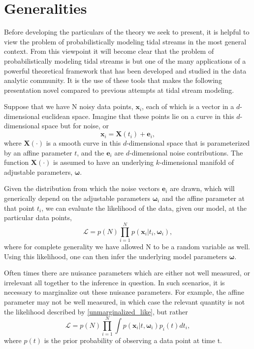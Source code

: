 \documentclass[12pt,preprint]{aastex}
\newcommand{\mtensor}[1]{\boldsymbol{#1}}
\newcommand{\mvector}[1]{\mtensor{#1}}
\newcommand{\ve}{\mvector{e}}
\newcommand{\vx}{\mvector{x}}
\newcommand{\vX}{\mvector{X}}
\newcommand{\vomega}{\mvector{\omega}}
\newcommand{\like}{\mathscr{L}}
\begin{document}
\section{Generalities}\label{Sec:Generalities}



Before developing the particulars of the theory we seek to present, it is helpful to view the problem of probabilistically modeling tidal streams in the most general context. From this viewpoint it will become clear that the problem of probabilistically modeling tidal streams is but one of the many applications of a powerful theoretical framework that has been developed and studied in the data analytic community.  It is the use of these tools that makes the following presentation novel compared to previous attempts at tidal stream modeling. 

Suppose that we have N noisy data points, $\vx_i$, each of which is a vector in a $d$-dimensional euclidean space. Imagine that these points lie on a curve in this $d$-dimensional space but for noise, or
\[ \vx_i = \vX(t_i) + \ve_i ,\]
where $\vX(\cdot)$ is a smooth curve in this $d$-dimensional space that is parameterized by an affine parameter $t$,  and the $\ve_i$ are $d$-dimensional noise contributions. The function $\vX(\cdot)$ is assumed to have an underlying $k$-dimensional manifold of adjustable parameters, $\vomega$.

Given the distribution from which the noise vectors $\ve_i$ are drawn, which will generically depend on the adjustable parameters $\vomega_i$ and the affine parameter at that point $t_i$, we can evaluate the likelihood of the data, given our model, at the particular data points,
\begin{equation}\label{unmarginalized_like}
\like = p(N) \prod_{i=1}^{N} p(\vx_i | t_i,\vomega_i),
\end{equation}
where for complete generality we have allowed N to be a random variable as well. Using this likelihood, one can then infer the underlying model parameters $\vomega$. 

Often times there are nuisance parameters which are either not well measured, or irrelevant all together to the inference in question. In such scenarios, it is necessary to marginalize out these nuisance parameters. For example, the affine parameter may not be well measured, in which case the relevant quantity is not the likelihood described by \eqref{unmarginalized_like}, but rather
\begin{equation}\label{marginalized_like}
\like = p(N)\prod_{i=1}^{N} \int p(\vx_i | t, \vomega_i) p_i(t) dt_i,
\end{equation}
where $p(t)$ is the prior probability of observing a data point at time t. 
\end{document}

